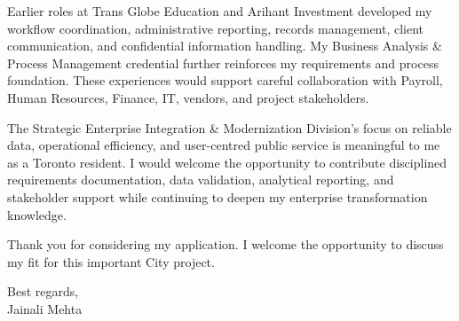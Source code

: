 \documentclass[letterpaper,10pt]{article}
\begin{document}
Earlier roles at Trans Globe Education and Arihant Investment developed my workflow coordination, administrative reporting, records management, client communication, and confidential information handling. My Business Analysis \& Process Management credential further reinforces my requirements and process foundation. These experiences would support careful collaboration with Payroll, Human Resources, Finance, IT, vendors, and project stakeholders.

The Strategic Enterprise Integration \& Modernization Division's focus on reliable data, operational efficiency, and user-centred public service is meaningful to me as a Toronto resident. I would welcome the opportunity to contribute disciplined requirements documentation, data validation, analytical reporting, and stakeholder support while continuing to deepen my enterprise transformation knowledge.

Thank you for considering my application. I welcome the opportunity to discuss my fit for this important City project.

Best regards,\\[8pt]
Jainali Mehta
\end{document}
